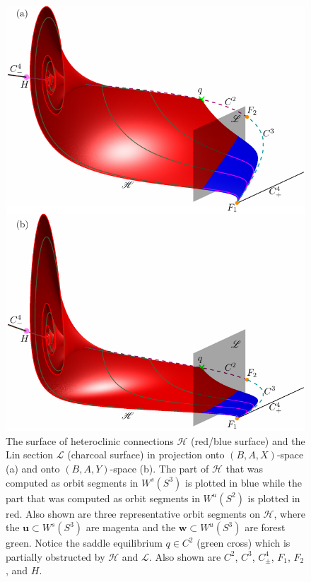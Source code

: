\documentclass{ws-ijbc}
\begin{document}
\begin{figure}[H]
\centering
\includegraphics[]{./figures/MKMO_9.pdf}
\caption{The surface of heteroclinic connections $\mathscr{H}$ (red/blue surface) and the Lin section $\mathscr{L}$ (charcoal surface) in projection onto $(B,A,X)$-space (a) and onto $(B,A,Y)$-space (b).  The part of $\mathscr{H}$ that was computed as orbit segments in $W^s(S^3)$ is plotted in blue while the part that was computed as orbit segments in $W^u(S^2)$ is plotted in red.  Also shown are three representative orbit segments on $\mathscr{H}$, where the $\mathbf{u} \subset W^s(S^3)$ are magenta and the $\mathbf{w} \subset W^u(S^3)$ are forest green.  Notice the saddle equilibrium $q \in C^2$ (green cross) which is partially obstructed by $\mathscr{H}$ and $\mathscr{L}$.  Also shown are $C^2$, $C^3$, $C^4_\pm$, $F_1$, $F_2$, and $H$.}
\label{figure_9}
\end{figure}
\end{document}
